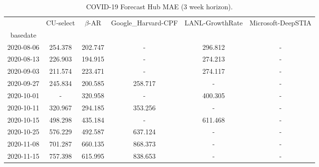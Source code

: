     
\begin{table*}[t]
\small
\caption{COVID-19 Forecast Hub MAE (3 week horizon).\label{tab:reichalb_eval_3} }

\centering
    
\begin{tabular}{cccccc}
\toprule
{} &                      CU-select &                      $\beta$-AR &            Google\_Harvard-CPF & LANL-GrowthRate & Microsoft-DeepSTIA \\
basedate   &                                &                                 &                                &                 &                    \\
\midrule
2020-08-06 &                        254.378 &   {\cellcolor{blue!25} 202.747} &                              - &         296.812 &                  - \\
2020-08-13 &                        226.903 &   {\cellcolor{blue!25} 194.915} &                              - &         274.213 &                  - \\
2020-09-03 &  {\cellcolor{blue!25} 211.574} &                         223.471 &                              - &         274.117 &                  - \\
2020-09-27 &                        245.834 &   {\cellcolor{blue!25} 200.585} &                        258.717 &               - &                  - \\
2020-10-01 &                              - &   {\cellcolor{blue!25} 320.958} &                              - &         400.305 &                  - \\
2020-10-11 &                        320.967 &   {\cellcolor{blue!25} 294.185} &                        353.256 &               - &                  - \\
2020-10-15 &                        498.298 &   {\cellcolor{blue!25} 435.184} &                              - &         611.468 &                  - \\
2020-10-25 &                        576.229 &   {\cellcolor{blue!25} 492.587} &                        637.124 &               - &                  - \\
2020-11-08 &                        701.287 &   {\cellcolor{blue!25} 660.135} &                        868.373 &               - &                  - \\
2020-11-15 &                        757.398 &   {\cellcolor{blue!25} 615.995} &                        838.653 &               - &                  - \\

\end{tabular}
\end{table*}

